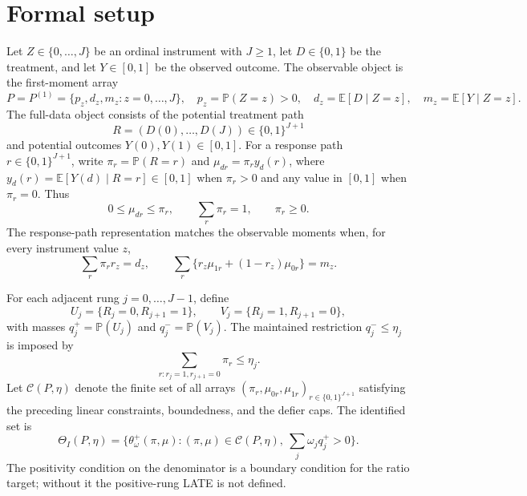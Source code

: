 \documentclass[11pt]{article}
\newcommand{\E}{\mathbb{E}}
\renewcommand{\Pr}{\mathbb{P}}
\theoremstyle{definition}
\theoremstyle{plain}
\theoremstyle{remark}
\begin{document}
\section{Formal setup}
Let \(Z\in\{0,\ldots,J\}\) be an ordinal instrument with \(J\ge1\), let
\(D\in\{0,1\}\) be the treatment, and let \(Y\in[0,1]\) be the observed
outcome.  The observable object is the first-moment array
\[
P=P^{(1)}=\{p_z,d_z,m_z:z=0,\ldots,J\},
\quad
p_z=\Pr(Z=z)>0,\quad
d_z=\E[D\mid Z=z],\quad
m_z=\E[Y\mid Z=z].
\]
The full-data object consists of the potential treatment path
\[
R=(D(0),\ldots,D(J))\in\{0,1\}^{J+1}
\]
and potential outcomes \(Y(0),Y(1)\in[0,1]\).  For a response path
\(r\in\{0,1\}^{J+1}\), write \(\pi_r=\Pr(R=r)\) and
\(\mu_{dr}=\pi_r y_d(r)\), where \(y_d(r)=\E[Y(d)\mid R=r]\in[0,1]\) when
\(\pi_r>0\) and any value in \([0,1]\) when \(\pi_r=0\).  Thus
\[
0\le \mu_{dr}\le \pi_r,\qquad
\sum_r\pi_r=1,\qquad
\pi_r\ge0.
\]
The response-path representation matches the observable moments when, for
every instrument value \(z\),
\[
\sum_r \pi_r r_z=d_z,\qquad
\sum_r\{r_z\mu_{1r}+(1-r_z)\mu_{0r}\}=m_z.
\]

For each adjacent rung \(j=0,\ldots,J-1\), define
\[
U_j=\{R_j=0,R_{j+1}=1\},\qquad
V_j=\{R_j=1,R_{j+1}=0\},
\]
with masses \(q_j^+=\Pr(U_j)\) and \(q_j^-=\Pr(V_j)\).  The maintained
restriction \(q_j^-\le\eta_j\) is imposed by
\[
\sum_{r:r_j=1,r_{j+1}=0}\pi_r\le\eta_j.
\]
Let \(\mathcal C(P,\eta)\) denote the finite set of all arrays
\((\pi_r,\mu_{0r},\mu_{1r})_{r\in\{0,1\}^{J+1}}\) satisfying the preceding
linear constraints, boundedness, and the defier caps.  The identified set is
\[
\Theta_I(P,\eta)
=\{\theta^+_\omega(\pi,\mu):(\pi,\mu)\in\mathcal C(P,\eta),
\ \sum_j\omega_j q_j^+>0\}.
\]
The positivity condition on the denominator is a boundary condition for the
ratio target; without it the positive-rung LATE is not defined.
\end{document}
